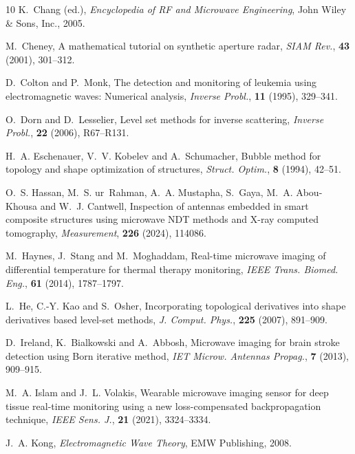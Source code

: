 \documentclass[a4,10pt]{article}
\theoremstyle{plain}
\theoremstyle{remark}
\begin{document}
\begin{thebibliography}{10}
\newblock K.~Chang (ed.),
\newblock \emph{Encyclopedia of RF and Microwave Engineering},
\newblock John Wiley \& Sons, Inc., 2005.

\newblock M.~Cheney,
\newblock A mathematical tutorial on synthetic aperture radar,
\newblock \emph{SIAM Rev.}, \textbf{43} (2001), 301--312.

\newblock D.~Colton and P.~Monk,
\newblock The detection and monitoring of leukemia using electromagnetic waves:
  Numerical analysis,
\newblock \emph{Inverse Probl.}, \textbf{11} (1995), 329--341.

\newblock O.~Dorn and D.~Lesselier,
\newblock Level set methods for inverse scattering,
\newblock \emph{Inverse Probl.}, \textbf{22} (2006), R67--R131.

\newblock H.~A. Eschenauer, V.~V. Kobelev and A.~Schumacher,
\newblock Bubble method for topology and shape optimization of structures,
\newblock \emph{Struct. Optim.}, \textbf{8} (1994), 42--51.

\newblock O.~S. Hassan, M.~S. ur~Rahman, A.~A. Mustapha, S.~Gaya, M.~A.
  Abou-Khousa and W.~J. Cantwell,
\newblock Inspection of antennas embedded in smart composite structures using
  microwave {NDT} methods and {X}-ray computed tomography,
\newblock \emph{Measurement}, \textbf{226} (2024), 114086.

\newblock M.~Haynes, J.~Stang and M.~Moghaddam,
\newblock Real-time microwave imaging of differential temperature for thermal
  therapy monitoring,
\newblock \emph{IEEE Trans. Biomed. Eng.}, \textbf{61} (2014), 1787--1797.

\newblock L.~He, C.-Y. Kao and S.~Osher,
\newblock Incorporating topological derivatives into shape derivatives based
  level-set methods,
\newblock \emph{J. Comput. Phys.}, \textbf{225} (2007), 891--909.

\newblock D.~Ireland, K.~Bialkowski and A.~Abbosh,
\newblock Microwave imaging for brain stroke detection using {B}orn iterative
  method,
\newblock \emph{IET Microw. Antennas Propag.}, \textbf{7} (2013), 909--915.

\newblock M.~A. Islam and J.~L. Volakis,
\newblock Wearable microwave imaging sensor for deep tissue real-time
  monitoring using a new loss-compensated backpropagation technique,
\newblock \emph{{IEEE} Sens. J.}, \textbf{21} (2021), 3324--3334.

\newblock J.~A. Kong,
\newblock \emph{Electromagnetic Wave Theory},
\newblock EMW Publishing, 2008.


\end{thebibliography}
\end{document}
